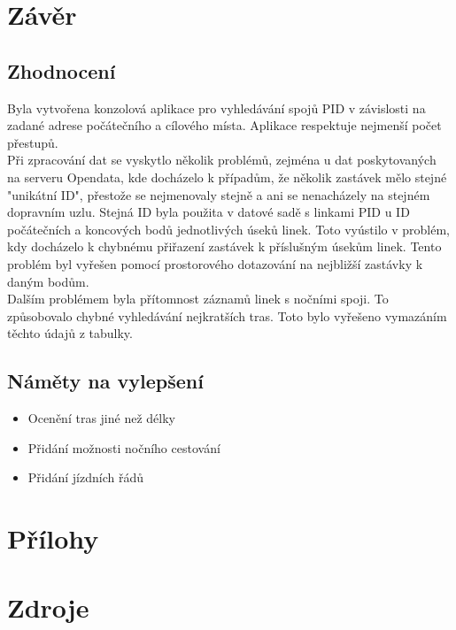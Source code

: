 \documentclass[a4paper, 12pt]{article}
\begin{document}
\newpage
\section{Závěr}
\subsection{Zhodnocení}
Byla vytvořena konzolová aplikace pro vyhledávání spojů PID v závislosti na zadané adrese počátečního a cílového místa. Aplikace respektuje nejmenší počet přestupů. \\
Při zpracování dat se vyskytlo několik problémů, zejména u dat poskytovaných na serveru Opendata, kde docházelo k případům, že několik zastávek mělo stejné "unikátní ID", přestože se nejmenovaly stejně a ani se nenacházely na stejném dopravním uzlu. Stejná ID byla použita v datové sadě s linkami PID u ID počátečních a koncových bodů jednotlivých úseků linek. Toto vyústilo v problém, kdy docházelo k chybnému přiřazení zastávek k příslušným úsekům linek. Tento problém byl vyřešen pomocí prostorového dotazování na nejbližší zastávky k daným bodům. \\
Dalším problémem byla přítomnost záznamů linek s nočními spoji. To způsobovalo chybné vyhledávání nejkratších tras. Toto bylo vyřešeno vymazáním těchto údajů z tabulky.

\subsection{Náměty na vylepšení}
\begin{itemize}
	\item Ocenění tras jiné než délky
	\item Přidání možnosti nočního cestování
	\item Přidání jízdních řádů
\end{itemize}

\newpage
\section{Přílohy}


\newpage
\section{Zdroje}
\end{document}
